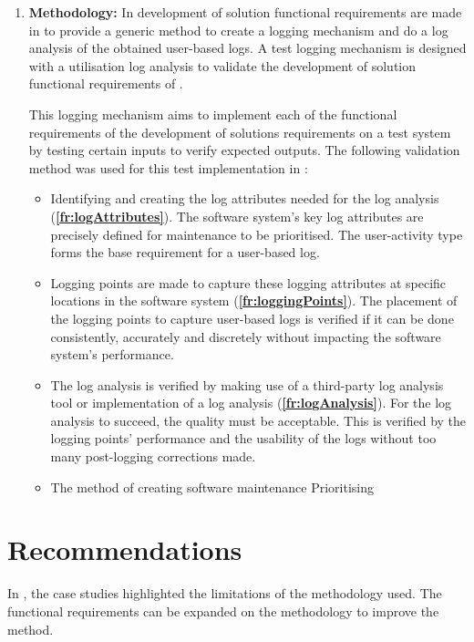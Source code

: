 \begin{enumerate}[label=\textbf{\Roman*.}]
	\item \textbf{Methodology:} In  development of solution functional requirements are made in  to provide a generic method to create a logging mechanism and do a log analysis of the obtained user-based logs. A test logging mechanism is designed with a utilisation log analysis to validate the development of solution functional requirements of .\par This logging mechanism aims to implement each of the functional requirements of the development of solutions requirements on a test system by testing certain inputs to verify expected outputs. The following validation method was used for this test implementation in :
		\begin{itemize}
			\item Identifying and creating the log attributes needed for the log analysis (\textbf{\ref{fr:logAttributes}}). The software system's key log attributes are precisely defined for maintenance to be prioritised. The user-activity type forms the base requirement for a user-based log.
			
			\item Logging points are made to capture these logging attributes at specific locations in the software system (\textbf{\ref{fr:loggingPoints}}). The placement of the logging points to capture user-based logs is verified if it can be done consistently, accurately and discretely without impacting the software system's performance. 
			
			\item The log analysis is verified by making use of a third-party log analysis tool or implementation of a log analysis (\textbf{\ref{fr:logAnalysis}}). For the log analysis to succeed, the quality must be acceptable. This is verified by the logging points' performance and the usability of the logs without too many post-logging corrections made.
			
			\item The method of creating software maintenance Prioritising
		\end{itemize}
\end{enumerate}

\section{Recommendations}
In , the case studies highlighted the limitations of the methodology used.
The functional requirements can be expanded on the methodology to improve the method.

